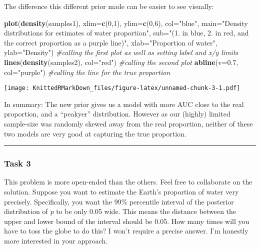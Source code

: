 \documentclass[]{article}
\newenvironment{Shaded}{\begin{snugshade}}{\end{snugshade}}
\newcommand{\CommentTok}[1]{\textcolor[rgb]{0.56,0.35,0.01}{\textit{#1}}}
\newcommand{\DataTypeTok}[1]{\textcolor[rgb]{0.13,0.29,0.53}{#1}}
\newcommand{\DecValTok}[1]{\textcolor[rgb]{0.00,0.00,0.81}{#1}}
\newcommand{\FloatTok}[1]{\textcolor[rgb]{0.00,0.00,0.81}{#1}}
\newcommand{\KeywordTok}[1]{\textcolor[rgb]{0.13,0.29,0.53}{\textbf{#1}}}
\newcommand{\NormalTok}[1]{#1}
\newcommand{\StringTok}[1]{\textcolor[rgb]{0.31,0.60,0.02}{#1}}
\begin{document}
The difference this different prior made can be easier to see visually:

\begin{Shaded}
\begin{Highlighting}[]
\KeywordTok{plot}\NormalTok{(}\KeywordTok{density}\NormalTok{(samples1), }\DataTypeTok{xlim=}\KeywordTok{c}\NormalTok{(}\DecValTok{0}\NormalTok{,}\DecValTok{1}\NormalTok{), }\DataTypeTok{ylim=}\KeywordTok{c}\NormalTok{(}\DecValTok{0}\NormalTok{,}\DecValTok{6}\NormalTok{), }\DataTypeTok{col=}\StringTok{"blue"}\NormalTok{, }\DataTypeTok{main=}\StringTok{"Density distributions for estimates of water proportion"}\NormalTok{, }\DataTypeTok{sub=}\StringTok{"(1. in blue, 2. in red, and the correct proportion as a purple line)"}\NormalTok{, }\DataTypeTok{xlab=}\StringTok{"Proportion of water"}\NormalTok{, }\DataTypeTok{ylab=}\StringTok{"Density"}\NormalTok{) }\CommentTok{#calling the first plot as well as setting label and x/y limits}
\KeywordTok{lines}\NormalTok{(}\KeywordTok{density}\NormalTok{(samples2), }\DataTypeTok{col=}\StringTok{"red"}\NormalTok{) }\CommentTok{#calling the second plot}
\KeywordTok{abline}\NormalTok{(}\DataTypeTok{v=}\FloatTok{0.7}\NormalTok{, }\DataTypeTok{col=}\StringTok{"purple"}\NormalTok{) }\CommentTok{#calling the line for the true proportion}
\end{Highlighting}
\end{Shaded}

\texttt{[image: KnittedRMarkDown\_files/figure-latex/unnamed-chunk-3-1.pdf]}

In summary: The new prior gives us a model with more AUC close to the
real proportion, and a ``peakyer'' distribution. However as our (highly)
limited sample-size was randomly skewed away from the real proportion,
neither of these two models are very good at capturing the true
proportion.

\begin{center}\rule{0.5\linewidth}{\linethickness}\end{center}

\hypertarget{task-3}{%
\subsubsection{Task 3}\label{task-3}}

This problem is more open-ended than the others. Feel free to
collaborate on the solution. Suppose you want to estimate the Earth's
proportion of water very precisely. Specifically, you want the 99\%
percentile interval of the posterior distribution of \emph{p} to be only
0.05 wide. This means the distance between the upper and lower bound of
the interval should be 0.05. How many times will you have to toss the
globe to do this? I won't require a precise answer. I'm honestly more
interested in your approach.
\end{document}
